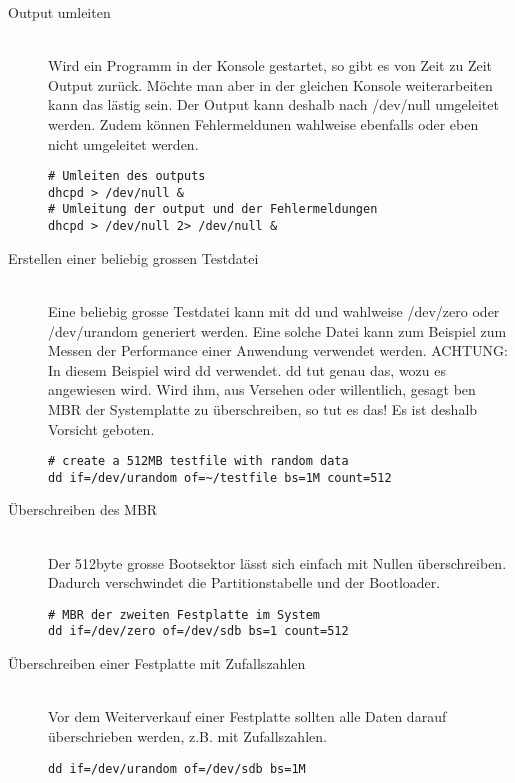 \begin{description}
\item[Output umleiten] \hfill \\
Wird ein Programm in der Konsole gestartet, so gibt es von Zeit zu Zeit Output zur\"uck. M\"ochte man aber in der gleichen Konsole weiterarbeiten kann das l\"astig sein. Der Output kann deshalb nach /dev/null umgeleitet werden. Zudem k\"onnen Fehlermeldunen wahlweise ebenfalls oder eben nicht umgeleitet werden.
\begin{lstlisting}[frame=single]
# Umleiten des outputs
dhcpd > /dev/null &
# Umleitung der output und der Fehlermeldungen
dhcpd > /dev/null 2> /dev/null &
\end{lstlisting}
\item[Erstellen einer beliebig grossen Testdatei] \hfill \\
Eine beliebig grosse Testdatei kann mit dd und wahlweise /dev/zero oder /dev/urandom generiert werden. Eine solche Datei kann zum Beispiel zum Messen der Performance einer Anwendung verwendet werden. ACHTUNG: In diesem Beispiel wird dd verwendet. dd tut genau das, wozu es angewiesen wird. Wird ihm, aus Versehen oder willentlich, gesagt ben MBR der Systemplatte zu \"uberschreiben, so tut es das! Es ist deshalb Vorsicht geboten.
\begin{lstlisting}[frame=single]
# create a 512MB testfile with random data
dd if=/dev/urandom of=~/testfile bs=1M count=512
\end{lstlisting}
\item[\"Uberschreiben des MBR] \hfill \\
Der 512byte grosse Bootsektor l\"asst sich einfach mit Nullen \"uberschreiben. Dadurch verschwindet die Partitionstabelle und der Bootloader.
\begin{lstlisting}[frame=single]
# MBR der zweiten Festplatte im System
dd if=/dev/zero of=/dev/sdb bs=1 count=512
\end{lstlisting}
\item[\"Uberschreiben einer Festplatte mit Zufallszahlen] \hfill \\
Vor dem Weiterverkauf einer Festplatte sollten alle Daten darauf \"uberschrieben werden, z.B. mit Zufallszahlen.
\begin{lstlisting}[frame=single]
dd if=/dev/urandom of=/dev/sdb bs=1M
\end{lstlisting}
\end{description}
